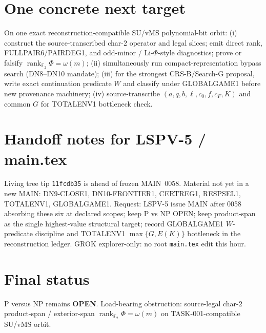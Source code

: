 \documentclass[11pt]{article}
\begin{document}
\section*{One concrete next target}
On one exact reconstruction-compatible SU/vMS polynomial-bit orbit: (i) construct
the source-transcribed char-$2$ operator and legal slices; emit direct rank,
FULLPAIR6/PAIRDEG1, and odd-minor / Li-$\Phi$-style diagnostics; prove or
falsify $\boxed{\operatorname{rank}_{\mathbb F_2}\Phi=\omega(m)}$;
(ii) simultaneously run compact-representation bypass search (DN8--DN10
mandate); (iii) for the strongest CRS-B/Search-G proposal, write exact
continuation predicate $W$ and classify under GLOBALGAME1 before new provenance
machinery; (iv) source-transcribe $(a,q,b,\ell,c_0,f,c_F,K)$ and common $G$
for TOTALENV1 bottleneck check.

\section*{Handoff notes for LSPV-5 / main.tex}
Living tree tip \texttt{11fcdb35} is ahead of frozen MAIN~0058. Material not
yet in a new MAIN: DN9-CLOSE1, DN10-FRONTIER1, CERTREG1, RESPSEL1, TOTALENV1,
GLOBALGAME1. Request: LSPV-5 issue MAIN after 0058 absorbing these six at
declared scopes; keep P vs NP OPEN; keep product-span as the single highest-value
structural target; record GLOBALGAME1 $W$-predicate discipline and TOTALENV1
$\max\{G,E(K)\}$ bottleneck in the reconstruction ledger. GROK explorer-only:
no root \texttt{main.tex} edit this hour.

\section*{Final status}
P versus NP remains \textbf{OPEN}.
Load-bearing obstruction: source-legal char-$2$ product-span / exterior-span
$\operatorname{rank}_{\mathbb F_2}\Phi=\omega(m)$ on TASK-001-compatible SU/vMS
orbit.

\end{document}
